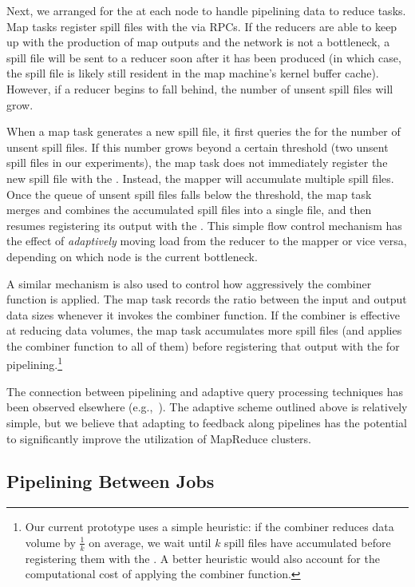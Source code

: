 Next, we arranged for the {\TT} at each node to handle pipelining data to reduce
tasks. Map tasks register spill files with the {\TT} via RPCs. If the reducers
are able to keep up with the production of map outputs and the network is not a
bottleneck, a spill file will be sent to a reducer soon after it has been
produced (in which case, the spill file is likely still resident in the map
machine's kernel buffer cache). However, if a reducer begins to fall behind, the
number of unsent spill files will grow.

When a map task generates a new spill file, it first queries the {\TT} for the
number of unsent spill files. If this number grows beyond a certain threshold
(two unsent spill files in our experiments), the map task does not immediately
register the new spill file with the {\TT}. Instead, the mapper will accumulate
multiple spill files. Once the queue of unsent spill files falls below the
threshold, the map task merges and combines the accumulated spill files into a
single file, and then resumes registering its output with the {\TT}. This simple
flow control mechanism has the effect of \emph{adaptively} moving load from the
reducer to the mapper or vice versa, depending on which node is the current
bottleneck.

A similar mechanism is also used to control how aggressively the combiner
function is applied. The map task records the ratio between the input and output
data sizes whenever it invokes the combiner function. If the combiner is
effective at reducing data volumes, the map task accumulates more spill files
(and applies the combiner function to all of them) before registering that
output with the {\TT} for pipelining.\footnote{Our current prototype uses a
  simple heuristic: if the combiner reduces data volume by $\frac{1}{k}$ on
  average, we wait until $k$ spill files have accumulated before registering
  them with the {\TT}. A better heuristic would also account for the computational
  cost of applying the combiner function.}

The connection between pipelining and adaptive query processing techniques has
been observed elsewhere (e.g.,~\cite{eddies}). The adaptive scheme outlined
above is relatively simple, but we believe that adapting to feedback along
pipelines has the potential to significantly improve the utilization of
MapReduce clusters.

\subsection{Pipelining Between Jobs}
\label{sec:inter-pipe}

